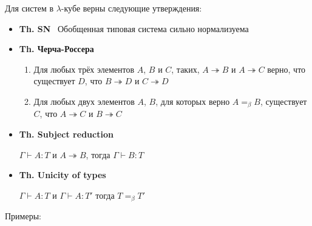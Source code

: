 Для систем в $\lambda$-кубе верны следующие утверждения:
\begin{itemize}
    \item \textbf{Th. SN} \qquad \qquad \qquad \quad \quad \ Обобщенная типовая система сильно нормализуема
    \item \textbf{Th. Черча-Россера} \quad \begin{minipage}{0.6\textwidth}
\raggedright %
\begin{enumerate}
    \item Для любых трёх элементов $A$, $B$ и $C$, таких,
    $A \twoheadrightarrow B$ и $A \twoheadrightarrow C$ верно,
    что существует $D$, что
    $B \twoheadrightarrow D$ и $C \twoheadrightarrow D$
    \item Для любых двух элементов $A$, $B$, для которых верно $A =_\beta B$,
    существует $C$, что $A \twoheadrightarrow C$ и $B \twoheadrightarrow C$
\end{enumerate}
\end{minipage}
    \item \textbf{Th. Subject reduction} \quad \begin{minipage}{0.6\textwidth}
\raggedright %
    $\Gamma \vdash A : T$ и $A \twoheadrightarrow B$, тогда $\Gamma \vdash B : T$
\end{minipage}
    \item \textbf{Th. Unicity of types} \quad \ \  \begin{minipage}{0.6\textwidth}
\raggedright %
    $\Gamma \vdash A : T$ и $\Gamma \vdash A : T'$ тогда $T =_\beta T'$
\end{minipage}
\end{itemize}


\vspace{5mm}

Примеры:

